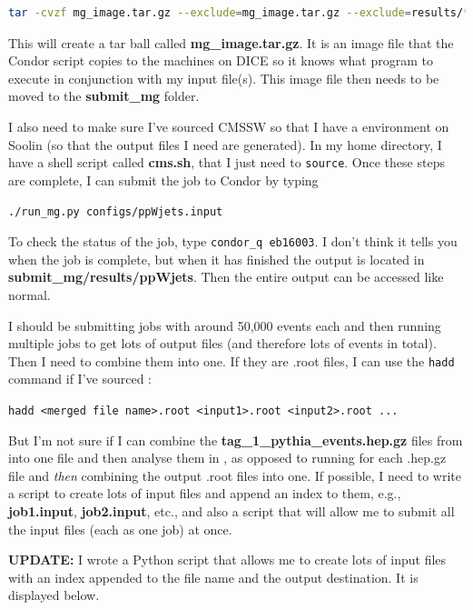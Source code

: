 \begin{lstlisting}[belowskip=-0.7cm, language=sh, numbers=none]
tar -cvzf mg_image.tar.gz --exclude=mg_image.tar.gz --exclude=results/* *
\end{lstlisting}

This will create a tar ball called \textbf{mg\_image.tar.gz}. It is an image file that the Condor script copies to the machines on DICE so it knows what program to execute in conjunction with my input file(s). This image file then needs to be moved to the \textbf{submit\_mg} folder.

I also need to make sure I've sourced CMSSW so that I have a \ROOT environment on Soolin (so that the output files I need are generated). In my home directory, I have a shell script called \textbf{cms.sh}, that I just need to \texttt{source}. Once these steps are complete, I can submit the job to Condor by typing

\texttt{./run\_mg.py configs/ppWjets.input}

To check the status of the job, type \texttt{condor\_q eb16003}. I don't think it tells you when the job is complete, but when it has finished the output is located in \textbf{submit\_mg/results/ppWjets}. Then the entire \madgraph output can be accessed like normal.

I should be submitting jobs with around 50,000 events each and then running multiple jobs to get lots of output files (and therefore lots of events in total). Then I need to combine them into one. If they are .root files, I can use the \texttt{hadd} command if I've sourced \ROOT:

\texttt{hadd <merged file name>.root <input1>.root <input2>.root ...}

But I'm not sure if I can combine the \textbf{tag\_1\_pythia\_events.hep.gz} files from \madgraph into one file and then analyse them in \madanalysis, as opposed to running \madanalysis for each .hep.gz file and \emph{then} combining the output .root files into one. If possible, I need to write a script to create lots of input files and append an index to them, e.g., \textbf{job1.input}, \textbf{job2.input}, etc., and also a script that will allow me to submit all the input files (each as one job) at once.

\textbf{UPDATE:} I wrote a Python script that allows me to create lots of input files with an index appended to the file name and the \madgraph output destination. It is displayed below.

 


